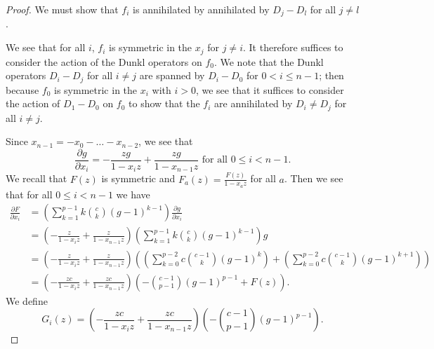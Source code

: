 \documentclass{amsart}
\numberwithin{equation}{section}
\theoremstyle{definition}
\begin{document}
\begin{proof}
We must show that $f_i$ is annihilated by annihilated by $D_j-D_l$ for all $j \ne l$.

We see that for all $i$, $f_i$ is symmetric in the $x_j$ for $j \ne i$. It therefore suffices to consider the action of the Dunkl operators on $f_0$. We note that the Dunkl operators $D_i-D_j$ for all $i \ne j$ are spanned by $D_i-D_0$ for $0<i \le n-1$; then because $f_0$ is symmetric in the $x_i$ with $i > 0$, we see that it suffices to consider the action of $D_1-D_0$ on $f_0$ to show that the $f_i$ are annihilated by $D_i \ne D_j$ for all $i \ne j$. 

Since $x_{n-1}=-x_0-\dots-x_{n-2}$, we see that
\[
\frac{\partial g}{\partial x_i}=-\frac{zg}{1-x_iz}+\frac{zg}{1-x_{n-1}z} \text{ for all $0 \le i < n-1$}.
\]
We recall that $F(z)$ is symmetric and $F_a(z)=\frac{F(z)}{1-x_az}$ for all $a$. Then we see that for all $0 \le i < n-1$ we have 
\begin{align*}
\frac{\partial F}{\partial x_i}%
&=\left(\sum_{k=1}^{p-1}k\binom{c}{k}(g-1)^{k-1}\right)\frac{\partial g}{\partial x_i}\\
&=\left(-\frac{z}{1-x_iz}+\frac{z}{1-x_{n-1}z}\right)\left(\sum_{k=1}^{p-1}k\binom{c}{k}(g-1)^{k-1}\right)g\\
&=\left(-\frac{z}{1-x_iz}+\frac{z}{1-x_{n-1}z}\right)\left(\left(\sum_{k=0}^{p-2}c\binom{c-1}{k}(g-1)^{k}\right)+\left(\sum_{k=0}^{p-2}c\binom{c-1}{k}(g-1)^{k+1}\right)\right)\\
&=\left(-\frac{zc}{1-x_iz}+\frac{zc}{1-x_{n-1}z}\right)\left(-\binom{c-1}{p-1}(g-1)^{p-1}+F(z)\right).
\end{align*}
We define
\[
G_i(z)=\left(-\frac{zc}{1-x_iz}+\frac{zc}{1-x_{n-1}z}\right)\left(-\binom{c-1}{p-1}(g-1)^{p-1}\right).
\]
\end{proof}
\end{document}

